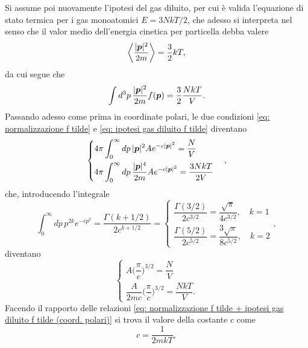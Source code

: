 Si assume poi nuovamente l'ipotesi del gas diluito, per cui è valida l'equazione di stato termica per i gas monoatomici $E = 3NkT/2$, che adesso si interpreta nel senso che il valor medio dell'energia cinetica per particella debba valere
\begin{equation}
    \left\langle \frac{|\bm{p}|^2}{2m} \right\rangle = \frac{3}{2}kT,
\end{equation}
da cui segue che
\begin{equation}
\label{eq: ipotesi gas diluito f tilde}
    \int d^3p\,\frac{|\bm{p}|^2}{2m}f(\bm{p}) = \frac{3}{2}\frac{NkT}{V}.
\end{equation}
Passando adesso come prima in coordinate polari, le due condizioni \eqref{eq: normalizzazione f tilde} e \eqref{eq: ipotesi gas diluito f tilde} diventano
\begin{equation}
    \begin{cases}
        4\pi\displaystyle\int_0^\infty dp\,|\bm{p}|^2Ae^{-c|\bm{p}|^2} = \dfrac{N}{V} \\[2ex]
        4\pi\displaystyle\int_0^\infty dp\,\dfrac{|\bm{p}|^4}{2m}Ae^{-c|\bm{p}|^2} = \dfrac{3NkT}{2V}
    \end{cases},
\end{equation}
che, introducendo l'integrale
\begin{equation}
    \int_0^\infty dp\,p^{2k}e^{-cp^2} = \frac{\Gamma(k + 1/2)}{2c^{k + 1/2}} = 
    \begin{cases}
        \dfrac{\Gamma(3/2)}{2c^{3/2}} = \dfrac{\sqrt{\pi}}{4c^{3/2}},\quad k = 1 \\[2ex]
        \dfrac{\Gamma(5/2)}{2c^{5/2}} = \dfrac{3\sqrt{\pi}}{8c^{5/2}},\quad k = 2
    \end{cases},
\end{equation}
diventano
\begin{equation}
\label{eq: normalizzazione f tilde + ipotesi gas diluito f tilde (coord. polari)}
    \begin{cases}
        A\bigg(\dfrac{\pi}{c}\bigg)^{3/2} = \dfrac{N}{V} \\[2ex]
        \dfrac{A}{2mc}\bigg(\dfrac{\pi}{c}\bigg)^{3/2} = \dfrac{NkT}{V}.
    \end{cases}
\end{equation}
Facendo il rapporto delle relazioni \eqref{eq: normalizzazione f tilde + ipotesi gas diluito f tilde (coord. polari)} si trova il valore della costante $c$ come
\begin{equation}
\label{eq: costante c distribuzione MB}
    c = \frac{1}{2mkT},
\end{equation}
